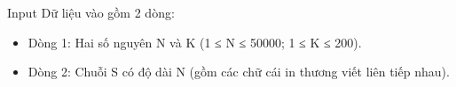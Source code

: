 Input
Dữ liệu vào gồm 2 dòng:  
\begin{itemize}
	\item     Dòng 1: Hai số nguyên N và K (1 ≤ N ≤ 50000; 1 ≤ K ≤ 200).   
	\item     Dòng 2: Chuỗi S có độ dài N (gồm các chữ cái in thương viết liên tiếp nhau).   
\end{itemize}